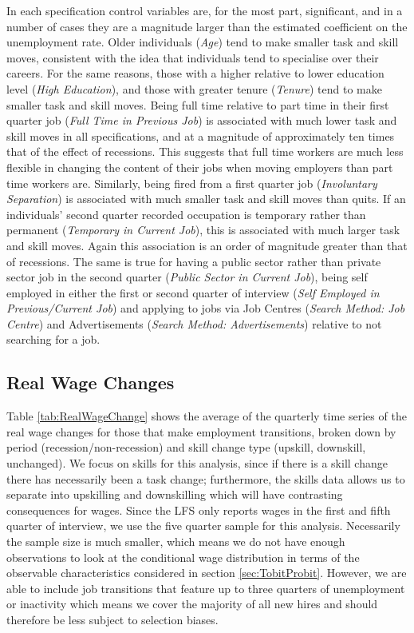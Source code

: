 \documentclass[11pt, oneside]{article}
\begin{document}
In each specification control variables are, for the most part, significant, and in a number of cases they are a magnitude larger than the estimated coefficient on the unemployment rate. Older individuals (\textit{Age}) tend to make smaller task and skill moves, consistent with the idea that individuals tend to specialise over their careers. For the same reasons, those with a higher relative to lower education level (\textit{High Education}), and those with greater tenure  (\textit{Tenure}) tend to make smaller task and skill moves. Being full time relative to part time in their first quarter job (\textit{Full Time in Previous Job}) is associated with much lower task and skill moves in all specifications, and at a magnitude of approximately ten times that of the effect of recessions. This suggests that full time workers are much less flexible in changing the content of their jobs when moving employers than part time workers are. Similarly, being fired from a first quarter job (\textit{Involuntary Separation}) is associated with much smaller task and skill moves than quits.
If an individuals' second quarter recorded occupation is temporary rather than permanent (\textit{Temporary in Current Job}), this is associated with much larger task and skill moves. Again this association is an order of magnitude greater than that of recessions. The same is true for having a public sector rather than private sector job in the second quarter (\textit{Public Sector in Current Job}), being self employed in either the first or second quarter of interview (\textit{Self Employed in Previous/Current Job}) and applying to jobs via Job Centres (\textit{Search Method: Job Centre}) and Advertisements (\textit{Search Method: Advertisements}) relative to not searching for a job.
	\subsection{Real Wage Changes}
	
	
	Table \ref{tab:RealWageChange} shows the average of the quarterly time series of the real wage changes for those that make employment transitions, broken down by period (recession/non-recession) and skill change type (upskill, downskill, unchanged). We focus on skills for this analysis, since if there is a skill change there has necessarily been a task change; furthermore, the skills data allows us to separate into upskilling and downskilling which will have contrasting consequences for wages. Since the LFS only reports wages in the first and fifth quarter of interview, we use the five quarter sample for this analysis. Necessarily the sample size is much smaller, which means we do not have enough observations to look at the conditional wage distribution in terms of the observable characteristics considered in section \ref{sec:TobitProbit}. However, we are able to include job transitions that feature up to three quarters of unemployment or inactivity which means we cover the majority of all new hires and should therefore be less subject to selection biases. 
	
\end{document}

